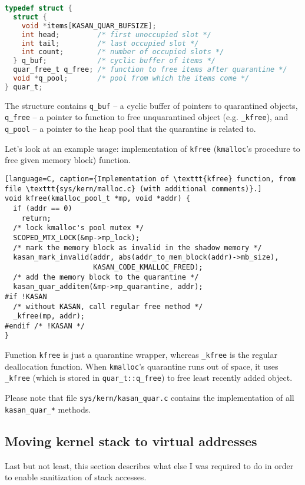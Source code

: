 \documentclass[shortabstract, manyadvisors, english, mgr]{iithesis}
\theoremstyle{definition} \newtheorem*{definition}{Definicja}
\theoremstyle{definition} \newtheorem*{example}{Przykład}
\theoremstyle{definition} \newtheorem*{remark}{Uwaga}
\begin{document}
\begin{lstlisting}[language=C, caption=Quarantine structure defined in \texttt{include/sys/kasan.h} file.]
typedef struct {
  struct {
    void *items[KASAN_QUAR_BUFSIZE];
    int head;         /* first unoccupied slot */
    int tail;         /* last occupied slot */
    int count;        /* number of occupied slots */
  } q_buf;            /* cyclic buffer of items */
  quar_free_t q_free; /* function to free items after quarantine */
  void *q_pool;       /* pool from which the items come */
} quar_t;
\end{lstlisting}

The structure contains \texttt{q\_buf} -- a cyclic buffer of pointers to quarantined objects, \texttt{q\_free} -- a pointer to function to free unquarantined object (e.g. \texttt{\_kfree}), and \texttt{q\_pool} -- a pointer to the heap pool that the quarantine is related to.

Let's look at an example usage: implementation of \texttt{kfree} (\texttt{kmalloc}'s procedure to free given memory block) function.

\begin{lstlisting}[language=C, caption={Implementation of \texttt{kfree} function, from file \texttt{sys/kern/malloc.c} (with additional comments)}.]
void kfree(kmalloc_pool_t *mp, void *addr) {
  if (addr == 0)
    return;
  /* lock kmalloc's pool mutex */
  SCOPED_MTX_LOCK(&mp->mp_lock);
  /* mark the memory block as invalid in the shadow memory */
  kasan_mark_invalid(addr, abs(addr_to_mem_block(addr)->mb_size),
                     KASAN_CODE_KMALLOC_FREED);
  /* add the memory block to the quarantine */
  kasan_quar_additem(&mp->mp_quarantine, addr);
#if !KASAN
  /* without KASAN, call regular free method */
  _kfree(mp, addr);
#endif /* !KASAN */
}
\end{lstlisting}

Function \texttt{kfree} is just a quarantine wrapper, whereas \texttt{\_kfree} is the regular deallocation function. When \texttt{kmalloc}'s quarantine runs out of space, it uses \texttt{\_kfree} (which is stored in \texttt{quar\_t::q\_free}) to free least recently added object.

Please note that file \texttt{sys/kern/kasan\_quar.c} contains the implementation of all \texttt{kasan\_quar\_*} methods.

\subsection{Moving kernel stack to virtual addresses}
Last but not least, this section describes what else I was required to do in order to enable sanitization of stack accesses.
\end{document}
